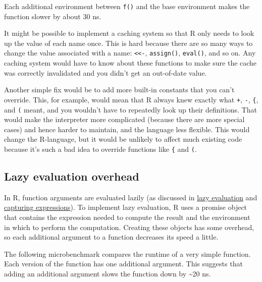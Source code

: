 Each additional environment between \texttt{f()} and the base
environment makes the function slower by about 30 ns.

It might be possible to implement a caching system so that R only needs
to look up the value of each name once. This is hard because there are
so many ways to change the value associated with a name:
\texttt{\textless{}\textless{}-}, \texttt{assign()}, \texttt{eval()},
and so on. Any caching system would have to know about these functions
to make sure the cache was correctly invalidated and you didn't get an
out-of-date value. \indexc{<<-}

Another simple fix would be to add more built-in constants that you
can't override. This, for example, would mean that R always knew exactly
what \texttt{+}, \texttt{-}, \texttt{\{}, and \texttt{(} meant, and you
wouldn't have to repeatedly look up their definitions. That would make
the interpreter more complicated (because there are more special cases)
and hence harder to maintain, and the language less flexible. This would
change the R-language, but it would be unlikely to affect much existing
code because it's such a bad idea to override functions like \texttt{\{}
and \texttt{(}.

\hypertarget{lazy-evaluation-overhead}{%
\subsection{Lazy evaluation overhead}\label{lazy-evaluation-overhead}}

In R, function arguments are evaluated lazily (as discussed in
\protect\hyperlink{lazy-evaluation}{lazy evaluation} and
\protect\hyperlink{capturing-expressions}{capturing expressions}). To
implement lazy evaluation, R uses a promise object that contains the
expression needed to compute the result and the environment in which to
perform the computation. Creating these objects has some overhead, so
each additional argument to a function decreases its speed a little.

The following microbenchmark compares the runtime of a very simple
function. Each version of the function has one additional argument. This
suggests that adding an additional argument slows the function down by
\textasciitilde{}20 ns.

